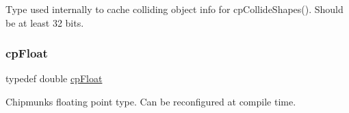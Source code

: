 Type used internally to cache colliding object info for cp\+Collide\+Shapes(). Should be at least 32 bits. \mbox{\label{group__basic_types_gac1ed65573e035bf892505768c852d8d3}} 
\subsubsection{\texorpdfstring{cp\+Float}{cpFloat}}
{\footnotesize\ttfamily typedef double \mbox{\hyperlink{group__basic_types_gac1ed65573e035bf892505768c852d8d3}{cp\+Float}}}

Chipmunk\textquotesingle{}s floating point type. Can be reconfigured at compile time. 